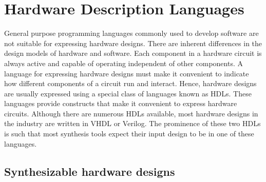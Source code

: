 \section{Hardware Description Languages}
General purpose programming languages commonly used to develop
software are not suitable for expressing hardware designs.
There are inherent differences in the design models of hardware and
software.
%
Each component in a hardware circuit is always active and capable of
operating independent of other components.
A language for expressing hardware designs must make it convenient to
indicate how different components of a circuit run and interact.
%
Hence, hardware designs are usually expressed using a special class of
languages known as \glspl{HDL}.
These languages provide constructs that make it convenient to express
hardware circuits.
%
Although there are numerous \glspl{HDL} available, most hardware
designs in the industry are written in VHDL or Verilog.
The prominence of these two \glspl{HDL} is such that most synthesis
tools expect their input design to be in one of these languages.

\subsection{Synthesizable hardware designs} \label{sec:synthesizability}

